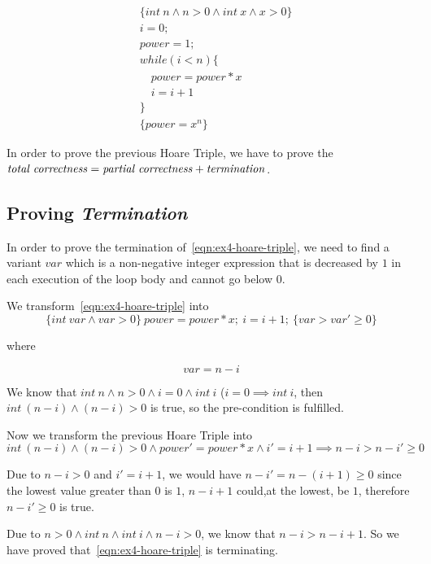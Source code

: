 \documentclass[a4paper,11pt]{report}
\begin{document}
\begin{equation}
\label{eqn:ex4-hoare-triple}
\begin{aligned}
  & \{int\ n \wedge n > 0 \wedge int\ x \wedge x > 0\} \\
  & i = 0;\\
  & power=1;\\
  & while(i < n)\{\\
  & \quad power = power * x\\
  & \quad i = i + 1\\
  & \}\\
  & \{power = x^n\}
\end{aligned}
\end{equation}

In order to prove the previous Hoare Triple, we have to prove the $\text{\textit{total
    correctness}} = \text{\textit{partial correctness}} +
\text{\textit{termination}}$.

\subsection*{Proving \textit{Termination}}

In order to prove the termination of~\eqref{eqn:ex4-hoare-triple}, we need to
find a variant $var$ which is a non-negative integer expression that is
decreased by $1$ in each execution of the loop body and cannot go below $0$.

We transform~\eqref{eqn:ex4-hoare-triple} into
\[
  \{int\ var \wedge var > 0\}\ power = power*x;\ i = i + 1;\ \{var > var' \geq 0\}
\]

where

\[
  var = n - i
\]

We know that $int\ n \wedge n > 0 \wedge i = 0 \wedge int\ i$ ($i = 0 \implies
int\ i$, then $int\ (n-i) \wedge (n-i) > 0$ is true, so the pre-condition is
fulfilled.

Now we transform the previous Hoare Triple into
\[
  int\ (n-i) \wedge (n-i) > 0 \wedge power' = power * x \wedge i' = i + 1
  \implies n - i > n - i' \geq 0
\]

Due to $n - i > 0$ and $i' = i + 1$, we would have $n - i' = n - (i + 1) \geq 0$
since the lowest value greater than $0$ is $1$, $n - i + 1$ could,at the lowest,
be $1$, therefore $n - i' \geq 0$ is true.

Due to $n > 0 \wedge int\ n \wedge int\ i \wedge n-i > 0$, we know that $n - i >
n - i + 1$. So we have proved that~\eqref{eqn:ex4-hoare-triple} is terminating.
\end{document}
